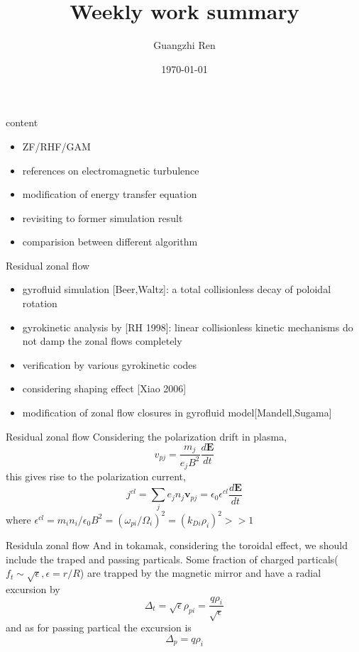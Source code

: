 \documentclass{beamer}
\title{Weekly work summary}
\author{Guangzhi Ren}
\institute {}
\date{\today}
\begin{document}
\begin{frame} %
\titlepage   
\end{frame}

\begin{frame}{content}
	\begin{itemize}
		\item ZF/RHF/GAM
		\item references on electromagnetic turbulence
		\item modification of energy transfer equation
		\item revisiting to former simulation result 
		\item comparision between different algorithm
	\end{itemize}
\end{frame}

\begin{frame}{Residual zonal flow}
	\begin{itemize}
		\item gyrofluid simulation [Beer,Waltz]: a total collisionless decay of poloidal rotation
		\item gyrokinetic analysis by [RH 1998]: linear collisionless kinetic mechanisms do not damp the zonal flows completely
		\item verification by various gyrokinetic codes
		\item considering shaping effect [Xiao 2006]
		\item modification of zonal flow closures in gyrofluid model[Mandell,Sugama]
	\end{itemize}
\end{frame}

\begin{frame}{Residual zonal flow }
	Considering the polarization drift in plasma, 
	\begin{equation}
		v_{pj}=\frac{m_j}{e_jB^2}\frac{d\pmb{E}}{dt}
	\end{equation}
	this gives rise to the polarization current,
	\begin{equation}
		j^{cl}=\sum_{j}{e_jn_j\pmb{v}_{pj}}=\epsilon_0\epsilon^{cl}\frac{d\pmb{E}}{dt}
	\end{equation}
	where $\epsilon^{cl}=m_in_i/\epsilon_0B^2=(\omega_{pi}/\Omega_i)^2=(k_{Di}\rho_i)^2>>1$
\end{frame}

\begin{frame}{Residula zonal flow}
	And in tokamak, considering the toroidal effect, we should include the traped and passing particals. Some fraction of charged particals($f_t\sim\sqrt{\epsilon},\epsilon=r/R$) are trapped by the magnetic mirror and have a radial excursion by 
	\begin{equation}
	\Delta_t=\sqrt{\epsilon}\rho_{pi}=\frac{q\rho_i}{\sqrt{\epsilon}}
	\end{equation}
	and as for passing partical the excursion is
	\begin{equation}
	\Delta_p=q\rho_i
	\end{equation}
\end{frame}
\end{document}
